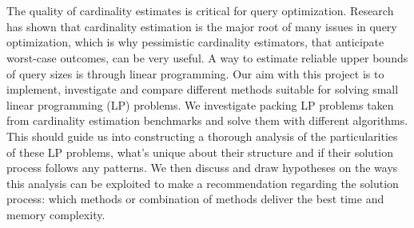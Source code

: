 \chapter{\abstractname}

The quality of cardinality estimates is critical for query optimization.
Research has 
shown that cardinality estimation is the major root of many issues in 
query optimization, which is why pessimistic cardinality estimators, that
anticipate worst-case outcomes, can be very useful.
A way to estimate reliable
upper bounds of query sizes is through linear programming.
Our aim with this project is to implement, 
investigate and compare different methods suitable for solving small linear programming (LP) problems.
We investigate packing LP problems taken from cardinality estimation benchmarks and solve them 
with different algorithms.
This should guide us into constructing a thorough analysis of the particularities of
these LP problems, what's unique about their structure and if their solution
process follows any patterns. We then discuss and draw hypotheses on the ways this 
analysis can be exploited to make a recommendation regarding the solution process: which methods or combination of methods deliver the best time and memory complexity.



